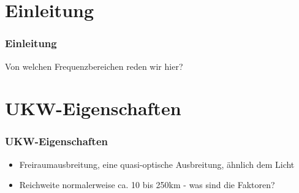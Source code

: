 

\subtitle{Betriebstechnik/Vorschriften 11: \\
          Betriebsabwicklung auf VHF/UHF \\[2em]}
\date{Stand 15.01.2015}



\section{Einleitung}

\begin{frame}
    \frametitle{Einleitung}

    \begin{block}{Von welchen Frequenzbereichen reden wir hier?}
    \end{block}

\end{frame}

\section{UKW-Eigenschaften}

\begin{frame}
    \frametitle{UKW-Eigenschaften}

    \begin{itemize}
        \item Freiraumausbreitung, eine quasi-optische Ausbreitung, ähnlich dem
              Licht
        \item Reichweite normalerweise ca. 10 bis 250km - was sind die Faktoren?
    \end{itemize}

\end{frame}

